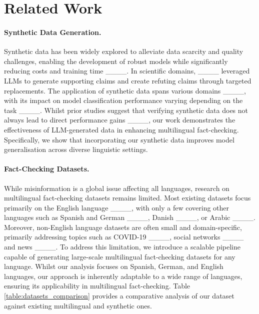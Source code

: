 \section{Related Work}
\label{sec:related_work}
\paragraph{Synthetic Data Generation.}
Synthetic data has been widely explored to alleviate data scarcity and quality challenges, enabling the development of robust models while significantly reducing costs and training time ____. In scientific domains, ____ leveraged LLMs to generate supporting claims and create refuting claims through targeted replacements.  
The application of synthetic data spans various domains ____, with its impact on model classification performance varying depending on the task ____. Whilst prior studies suggest that verifying synthetic data does not always lead to direct performance gains ____, our work demonstrates the effectiveness of LLM-generated data in enhancing multilingual fact-checking. Specifically, we show that incorporating our synthetic data improves model generalisation across diverse linguistic settings.

 
\paragraph{Fact-Checking Datasets.}
While misinformation is a global issue affecting all languages, research on multilingual fact-checking datasets remains limited. Most existing datasets focus primarily on the English language ____, with only a few covering other languages such as Spanish and German ____, Danish ____, or Arabic ____. 
Moreover, non-English language datasets are often small and domain-specific, primarily addressing topics such as COVID-19 ____, social networks ____ and news ____. 
To address this limitation, we introduce a scalable pipeline capable of generating large-scale multilingual fact-checking datasets for any language. Whilst our analysis focuses on Spanish, German, and English languages, our approach is inherently adaptable to a wide range of languages, ensuring its applicability in multilingual fact-checking. Table \ref{table:datasets_comparison} provides a comparative analysis of our dataset against existing multilingual and synthetic ones.

